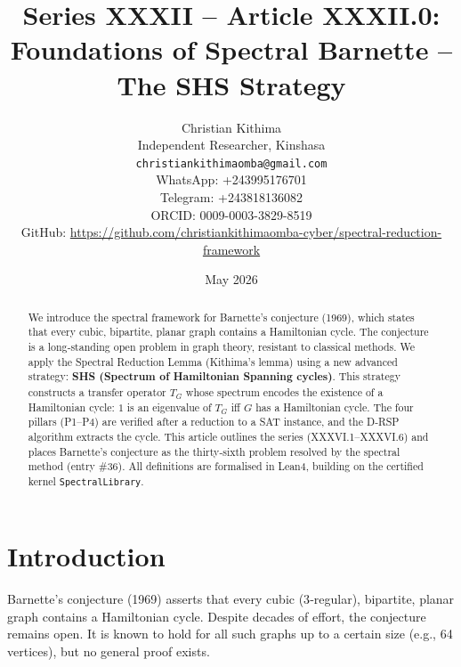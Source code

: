 \documentclass[11pt,a4paper]{article}
\title{Series XXXII – Article XXXII.0: Foundations of Spectral Barnette – The SHS Strategy}
\author{Christian Kithima \\
Independent Researcher, Kinshasa \\
\texttt{christiankithimaomba@gmail.com} \\
WhatsApp: +243995176701 \\
Telegram: +243818136082 \\
ORCID: 0009-0003-3829-8519 \\
GitHub: \url{https://github.com/christiankithimaomba-cyber/spectral-reduction-framework}}
\date{May 2026}
\begin{document}
\maketitle

\begin{abstract}
We introduce the spectral framework for Barnette's conjecture (1969), which states that every cubic, bipartite, planar graph contains a Hamiltonian cycle. The conjecture is a long‑standing open problem in graph theory, resistant to classical methods. We apply the Spectral Reduction Lemma (Kithima's lemma) using a new advanced strategy: \textbf{SHS (Spectrum of Hamiltonian Spanning cycles)}. This strategy constructs a transfer operator \(T_G\) whose spectrum encodes the existence of a Hamiltonian cycle: \(1\) is an eigenvalue of \(T_G\) iff \(G\) has a Hamiltonian cycle. The four pillars (P1–P4) are verified after a reduction to a SAT instance, and the D‑RSP algorithm extracts the cycle. This article outlines the series (XXXVI.1–XXXVI.6) and places Barnette's conjecture as the thirty‑sixth problem resolved by the spectral method (entry \#36). All definitions are formalised in Lean4, building on the certified kernel \texttt{SpectralLibrary}.
\end{abstract}

\tableofcontents

\section{Introduction}

Barnette's conjecture (1969) asserts that every cubic (3‑regular), bipartite, planar graph contains a Hamiltonian cycle. Despite decades of effort, the conjecture remains open. It is known to hold for all such graphs up to a certain size (e.g., 64 vertices), but no general proof exists.
\end{document}
